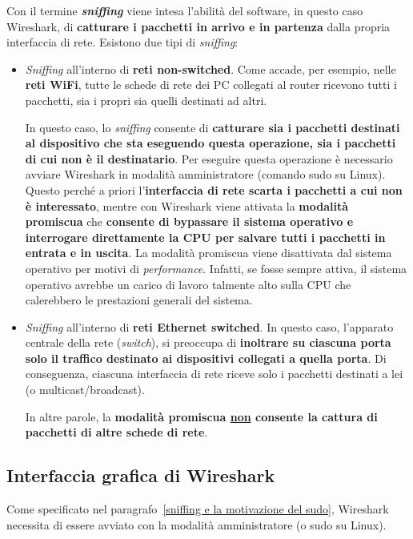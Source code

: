 \documentclass[a4paper]{article}
\begin{document}
	Con il termine \textcolor{Red3}{\textbf{\emph{sniffing}}} viene intesa l'abilità del software, in questo caso Wireshark, di \textbf{catturare i pacchetti in arrivo e in partenza} dalla propria interfaccia di rete. Esistono due tipi di \emph{sniffing}:
	\begin{itemize}
		\item \emph{Sniffing} all'interno di \textcolor{Red3}{\textbf{reti non-switched}}. Come accade, per esempio, nelle \textbf{reti WiFi}, tutte le schede di rete dei PC collegati al router ricevono tutti i pacchetti, sia i propri sia quelli destinati ad altri.
		
		In questo caso, lo \emph{sniffing} consente di \textbf{catturare sia i pacchetti destinati al dispositivo che sta eseguendo questa operazione, sia i pacchetti di cui non è il destinatario}. Per eseguire questa operazione è necessario avviare Wireshark in modalità amministratore (comando \textsf{sudo} su Linux). Questo perché a priori l'\textbf{interfaccia di rete scarta i pacchetti a cui non è interessato}, mentre con Wireshark viene attivata la \textcolor{Red3}{\textbf{modalità promiscua}} che \textbf{consente di bypassare il sistema operativo e interrogare direttamente la CPU per salvare tutti i pacchetti in entrata e in uscita}. La modalità promiscua viene disattivata dal sistema operativo per motivi di \emph{performance}. Infatti, se fosse sempre attiva, il sistema operativo avrebbe un carico di lavoro talmente alto sulla CPU che calerebbero le prestazioni generali del sistema.
		
		\item \emph{Sniffing} all'interno di \textcolor{Red3}{\textbf{reti Ethernet switched}}. In questo caso, l'apparato centrale della rete (\emph{switch}), si preoccupa di \textbf{inoltrare su ciascuna porta solo il traffico destinato ai dispositivi collegati a quella porta}. Di conseguenza, ciascuna interfaccia di rete riceve solo i pacchetti destinati a lei (o multicast/broadcast).
		
		In altre parole, la \textbf{modalità promiscua \underline{non} consente la cattura di pacchetti di altre schede di rete}.
	\end{itemize}\newpage

	\subsection{Interfaccia grafica di Wireshark}
	
	Come specificato nel paragrafo~\ref{sniffing e la motivazione del sudo}, Wireshark necessita di essere avviato con la modalità amministratore (o \textsf{sudo} su Linux).
	
\end{document}
